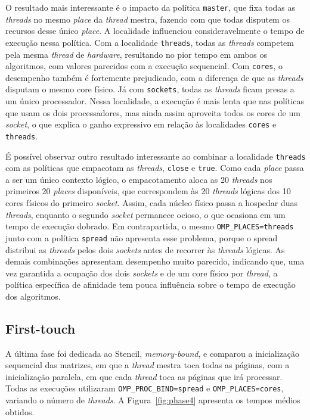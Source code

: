 \documentclass[12pt, letterpaper]{article}
\begin{document}
O resultado mais interessante é o impacto da política \texttt{master}, que fixa todas as \emph{threads} no mesmo \emph{place} da \emph{thread} mestra, fazendo com que todas disputem os recursos desse único \emph{place}. A localidade influenciou consideravelmente o tempo de execução nessa política. Com a localidade \texttt{threads}, todas as \emph{threads} competem pela mesma \emph{thread} de \emph{hardware}, resultando no pior tempo em ambos os algoritmos, com valores parecidos com a execução sequencial. Com \texttt{cores}, o desempenho também é fortemente prejudicado, com a diferença de que as \emph{threads} disputam o mesmo core físico. Já com \texttt{sockets}, todas as \emph{threads} ficam presas a um único processador. Nessa localidade, a execução é mais lenta que nas políticas que usam os dois processadores, mas ainda assim aproveita todos os cores de um \emph{socket}, o que explica o ganho expressivo em relação às localidades \texttt{cores} e \texttt{threads}.

É possível observar outro resultado interessante ao combinar a localidade \texttt{threads} com as políticas que empacotam as \emph{threads}, \texttt{close} e \texttt{true}. Como cada \emph{place} passa a ser um único contexto lógico, o empacotamento aloca as 20 \emph{threads} nos primeiros 20 \emph{places} disponíveis, que correspondem às 20 \emph{threads} lógicas dos 10 cores físicos do primeiro \emph{socket}. Assim, cada núcleo físico passa a hospedar duas \emph{threads}, enquanto o segundo \emph{socket} permanece ocioso, o que ocasiona em um tempo de execução dobrado. Em contrapartida, o mesmo \texttt{OMP\_PLACES=threads} junto com a política \texttt{spread} não apresenta esse problema, porque o spread distribui as \emph{threads} pelos dois \emph{sockets} antes de recorrer às \emph{threads} lógicas. As demais combinações apresentam desempenho muito parecido, indicando que, uma vez garantida a ocupação dos dois \emph{sockets} e de um core físico por \emph{thread}, a política específica de afinidade tem pouca influência sobre o tempo de execução dos algoritmos.


\subsection{First-touch}

A última fase foi dedicada ao Stencil, \emph{memory-bound}, e comparou a inicialização sequencial das matrizes, em que a \emph{thread} mestra toca todas as páginas, com a inicialização paralela, em que cada \emph{thread} toca as páginas que irá processar. Todas as execuções utilizaram \texttt{OMP\_PROC\_BIND=spread} e \texttt{OMP\_PLACES=cores}, variando o número de \emph{threads}. A Figura~\ref{fig:phase4} apresenta os tempos médios obtidos.
\end{document}
